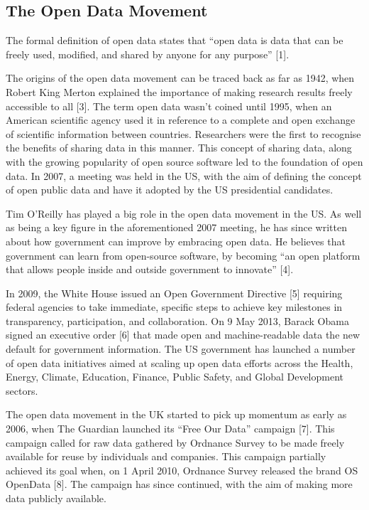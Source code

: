 \documentclass[authoryearcitations]{UoYCSproject}
\begin{document}
\subsection{The Open Data Movement}

The formal definition of open data states that “open data is data that can be freely used, modified, and shared by anyone for any purpose” [1].

The origins of the open data movement can be traced back as far as 1942, when Robert King Merton explained the importance of making research results freely accessible to all [3]. The term open data wasn’t coined until 1995, when an American scientific agency used it in reference to a complete and open exchange of scientific information between countries. Researchers were the first to recognise the benefits of sharing data in this manner. This concept of sharing data, along with the growing popularity of open source software led to the foundation of open data. In 2007, a meeting was held in the US, with the aim of defining the concept of open public data and have it adopted by the US presidential candidates. 

Tim O’Reilly has played a big role in the open data movement in the US. As well as being a key figure in the aforementioned 2007 meeting, he has since written about how government can improve by embracing open data.  He believes that government can learn from open-source software, by becoming “an open platform that allows people inside and outside government to innovate” [4]. 

In 2009,  the White House issued an Open Government Directive [5] requiring federal agencies to take immediate, specific steps to achieve key milestones in transparency, participation, and collaboration. On 9 May 2013, Barack Obama signed an executive order [6] that made open and machine-readable data the new default for government information. The US government has launched a number of open data initiatives aimed at scaling up open data efforts across the Health, Energy, Climate, Education, Finance, Public Safety, and Global Development sectors.

The open data movement in the UK started to pick up momentum as early as 2006, when The Guardian launched its “Free Our Data” campaign [7]. This campaign called for raw data gathered by Ordnance Survey to be made freely available for reuse by individuals and companies. This campaign partially achieved its goal when, on 1 April 2010, Ordnance Survey released the brand OS OpenData [8]. The campaign has since continued, with the aim of making more data publicly available. 
\end{document}
